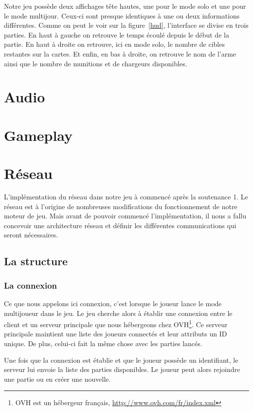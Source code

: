 \documentclass[11pt]{report}
\begin{document}
Notre jeu possède deux affichages tête hautes, une pour le mode solo et une pour le mode multijour. Ceux-ci sont presque identiques à une ou deux informations différentes. Comme on peut le voir sur la figure~\ref{hud}, l'interface se divise en trois parties. En haut à gauche on retrouve le temps écoulé depuis le début de la partie. En haut à droite on retrouve, ici en mode solo, le nombre de cibles restantes sur la cartes. Et enfin, en bas à droite, on retrouve le nom de l'arme ainsi que le nombre de munitions et de chargeurs disponibles.

\chapter{Audio}

\chapter{Gameplay}

\chapter{Réseau}

L'implémentation du réseau dans notre jeu à commencé après la soutenance 1. Le réseau est à l'origine de nombreuses modifications du fonctionnement de notre moteur de jeu. Mais avant de pouvoir commencé l'implémentation, il nous a fallu concevoir une architecture réseau et définir les différentes communications qui seront nécessaires.

\section{La structure}

\subsection{La connexion}

Ce que nous appelons ici connexion, c'est lorsque le joueur lance le mode multijoueur dans le jeu. Le jeu cherche alors à établir une connexion entre le client et un serveur principale que nous hébergeons chez OVH\footnote{OVH est un hébergeur français, \url{http://www.ovh.com/fr/index.xml}}. Ce serveur principale maintient une liste des joueurs connectés et leur attributs un ID unique. De plus, celui-ci fait la même chose avec les parties lancés.

Une fois que la connexion est établie et que le joueur possède un identifiant, le serveur lui envoie la liste des parties disponibles. Le joueur peut alors rejoindre une partie ou en créer une nouvelle.
\end{document}
